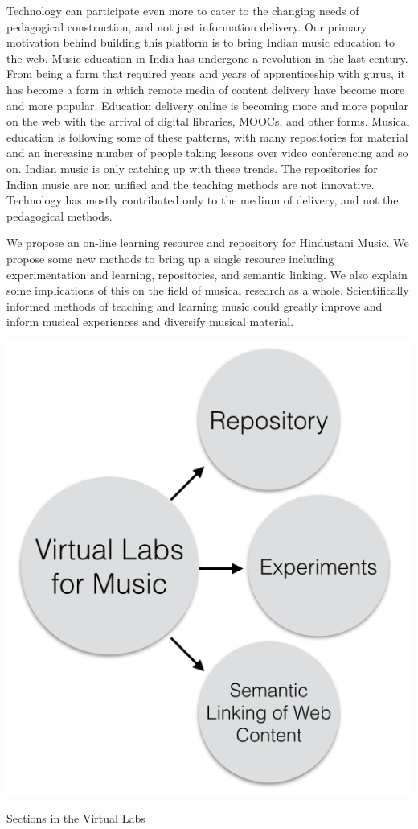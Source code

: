 \documentclass{tufte-handout}
\begin{document}
Technology can participate even more to cater to the changing needs of pedagogical construction, and not just information delivery. Our primary motivation behind building this platform is to bring Indian music education to the web. Music education in India has undergone a revolution in the last century. From being a form that required years and years of apprenticeship with gurus, it has become a form in which remote media of content delivery have become more and more popular. Education delivery online is becoming more and more popular on the web with the arrival of digital libraries, MOOCs, and other forms. Musical education is following some of these patterns, with many repositories for material and an increasing number of people taking lessons over video conferencing and so on. Indian music is only catching up with these trends. The repositories for Indian music are non unified and the teaching methods are not innovative. Technology has mostly contributed only to the medium of delivery, and not the pedagogical methods. 


We propose an on-line learning resource and repository for Hindustani Music. We propose some new methods to bring up a single resource including experimentation and learning, repositories, and semantic linking. We also explain some implications of this on the field of musical research as a whole. Scientifically informed methods of teaching and learning music could greatly improve and inform musical experiences and diversify musical material. 

\begin{marginfigure}%
  \includegraphics[width=\linewidth]{fig1.png}
  \caption{Sections in the Virtual Labs}
  \label{fig:marginfig}
\end{marginfigure}
\end{document}
